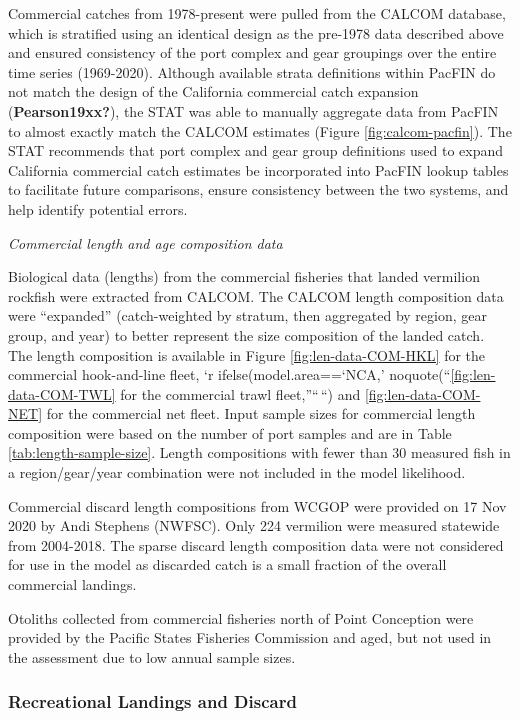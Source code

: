 \documentclass[
  english,
  a4paper,
]{article}
\begin{document}
Commercial catches from 1978-present were pulled from the CALCOM database, which is stratified using an identical design as the pre-1978 data described above and ensured consistency of the port complex and gear groupings over the entire time series (1969-2020). Although available strata definitions within PacFIN do not match the design of the California commercial catch expansion (\textbf{Pearson19xx?}), the STAT was able to manually aggregate data from PacFIN to almost exactly match the CALCOM estimates (Figure \ref{fig:calcom-pacfin}). The STAT recommends that port complex and gear group definitions used to expand California commercial catch estimates be incorporated into PacFIN lookup tables to facilitate future comparisons, ensure consistency between the two systems, and help identify potential errors.

\emph{Commercial length and age composition data}

Biological data (lengths) from the commercial fisheries that landed vermilion rockfish were extracted
from CALCOM. The CALCOM length composition data were ``expanded'' (catch-weighted by stratum, then aggregated by region, gear group, and year) to better represent the size composition of the landed catch. The length composition is available in Figure \ref{fig:len-data-COM-HKL}
for the commercial hook-and-line fleet,
`r ifelse(model.area==`NCA,' noquote(``\ref{fig:len-data-COM-TWL} for the commercial trawl fleet,''``\,``)
and \ref{fig:len-data-COM-NET} for the commercial net fleet.
Input sample sizes for commercial length composition were based on the number of port samples and are in Table \ref{tab:length-sample-size}. Length compositions with fewer than 30 measured fish in a region/gear/year combination were not included in the model likelihood.

Commercial discard length compositions from WCGOP were provided on
17 Nov 2020 by Andi Stephens (NWFSC). Only 224 vermilion were measured statewide from
2004-2018. The sparse discard length composition data were not considered for use in the
model as discarded catch is a small fraction of the overall commercial landings.

Otoliths collected from commercial fisheries north of Point Conception were provided by
the Pacific States Fisheries Commission and aged, but not used in the assessment due
to low annual sample sizes.

\hypertarget{recreational-landings-and-discard}{%
\subsubsection{Recreational Landings and Discard}\label{recreational-landings-and-discard}}
\end{document}
